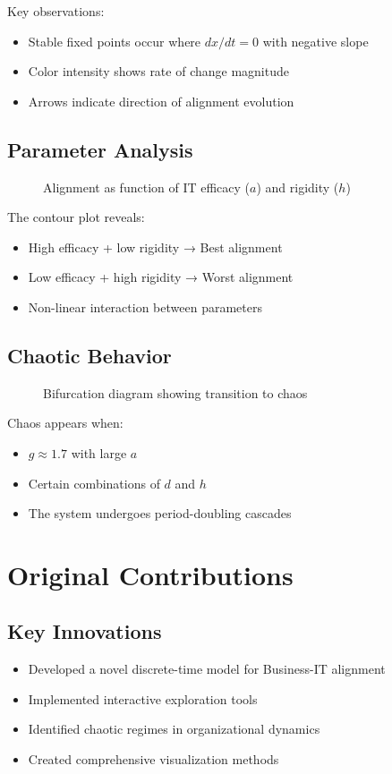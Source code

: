 \documentclass[a4paper, 12pt]{article}
\begin{document}
Key observations:
\begin{itemize}
	\item Stable fixed points occur where $dx/dt = 0$ with negative slope
	\item Color intensity shows rate of change magnitude
	\item Arrows indicate direction of alignment evolution
\end{itemize}

\subsection{Parameter Analysis}
\begin{figure}[h]
	\centering
	\caption{Alignment as function of IT efficacy ($a$) and rigidity ($h$)}
\end{figure}

The contour plot reveals:
\begin{itemize}
	\item High efficacy + low rigidity → Best alignment
	\item Low efficacy + high rigidity → Worst alignment
	\item Non-linear interaction between parameters
\end{itemize}

\subsection{Chaotic Behavior}
\begin{figure}[h]
	\centering
	\caption{Bifurcation diagram showing transition to chaos}
\end{figure}

Chaos appears when:
\begin{itemize}
	\item $g \approx 1.7$ with large $a$
	\item Certain combinations of $d$ and $h$
	\item The system undergoes period-doubling cascades
\end{itemize}

\section{Original Contributions}
\subsection{Key Innovations}
\begin{itemize}
	\item Developed a novel discrete-time model for Business-IT alignment
	\item Implemented interactive exploration tools
	\item Identified chaotic regimes in organizational dynamics
	\item Created comprehensive visualization methods
\end{itemize}
\end{document}
